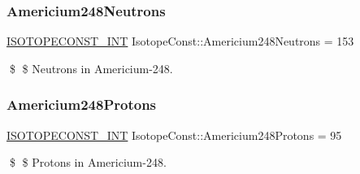 \subsubsection{\texorpdfstring{Americium248\+Neutrons}{Americium248Neutrons}}
{\footnotesize\ttfamily \mbox{\hyperlink{group___isotope_const-_macros_ga5f18360b3e99483a35c32d789e62621c}{I\+S\+O\+T\+O\+P\+E\+C\+O\+N\+S\+T\+\_\+\+I\+NT}} Isotope\+Const\+::\+Americium248\+Neutrons = 153}

\$ \$ Neutrons in Americium-\/248. \mbox{\label{group___isotope_const-_americium-_am248_ga6032f41a767134c48276c5d2569e58e8}} 
\subsubsection{\texorpdfstring{Americium248\+Protons}{Americium248Protons}}
{\footnotesize\ttfamily \mbox{\hyperlink{group___isotope_const-_macros_ga5f18360b3e99483a35c32d789e62621c}{I\+S\+O\+T\+O\+P\+E\+C\+O\+N\+S\+T\+\_\+\+I\+NT}} Isotope\+Const\+::\+Americium248\+Protons = 95}

\$ \$ Protons in Americium-\/248. 